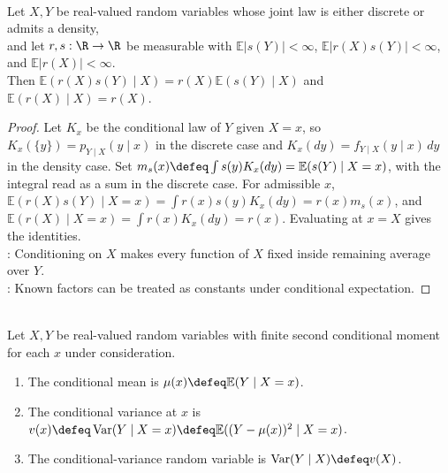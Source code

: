 \begin{proposition} \label{prop:conditional-expectation-pull-out-known-factor} \\
Let $X,Y$ be real-valued random variables whose joint law is either discrete or admits a density,\\
and let $r,s:\R\to\R$ be measurable with $\mathbb{E}|s(Y)|<\infty$, $\mathbb{E}|r(X)s(Y)|<\infty$, and $\mathbb{E}|r(X)|<\infty$.\\
Then $\mathbb{E}(r(X)s(Y)\mid X)=r(X)\mathbb{E}(s(Y)\mid X)$ and $\mathbb{E}(r(X)\mid X)=r(X)$.
\begin{proof}
Let $K_x$ be the conditional law of $Y$ given $X=x$, so $K_x(\{y\})=p_{Y\mid X}(y\mid x)$ in the discrete case and $K_x(dy)=f_{Y\mid X}(y\mid x)\,dy$ in the density case.
Set $m_s(x)\defeq\int s(y)K_x(dy)=\mathbb{E}(s(Y)\mid X=x)$, with the integral read as a sum in the discrete case.
For admissible $x$, $\mathbb{E}(r(X)s(Y)\mid X=x)=\int r(x)s(y)K_x(dy)=r(x)m_s(x)$, and $\mathbb{E}(r(X)\mid X=x)=\int r(x)K_x(dy)=r(x)$.
Evaluating at $x=X$ gives the identities.\\
: Conditioning on $X$ makes every function of $X$ fixed inside remaining average over $Y$.\\
: Known factors can be treated as constants under conditional expectation.
\end{proof}
\end{proposition}

\begin{definition} \label{def:conditional-variance-elementary} \\
Let $X,Y$ be real-valued random variables with finite second conditional moment for each $x$ under consideration.
\begin{enumerate}[label=(\roman*)]
\setlength{\itemsep}{0pt}
\item The conditional mean is $\mu(x)\defeq\mathbb{E}(Y\mid X=x)$.
\item The conditional variance at $x$ is $v(x)\defeq\operatorname{Var}(Y\mid X=x)\defeq\mathbb{E}((Y-\mu(x))^2\mid X=x)$.
\item The conditional-variance random variable is $\operatorname{Var}(Y\mid X)\defeq v(X)$.
\end{enumerate}
\end{definition}

